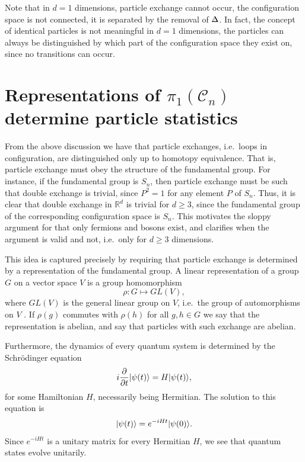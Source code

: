 \documentclass[a4paper,10pt,oneside]{book}
\theoremstyle{plain}
\theoremstyle{definition}
\theoremstyle{remark}
\def\bbDelta{{%
\setbox0\hbox{$\Delta$}%
\rlap{\hbox to \wd0{\hss\scalebox{0.82}{$\Delta$}}}\box0
}}
\DeclarePairedDelimiter\ket{\lvert}{\rangle}
\begin{document}
Note that in $d=1$ dimensions, particle exchange cannot occur, the configuration space is not connected, it is separated by the removal of $\bbDelta$. In fact, the concept of identical particles is not meaningful in $d = 1$ dimensions, the particles can always be distinguished by which part of the configuration space they exist on, since no transitions can occur.











\section{Representations of \texorpdfstring{$\pi_1(\mathcal{C}_n)$}{π₁(Cₙ)} determine particle statistics}

From the above discussion we have that particle exchanges, i.e.\ loops in configuration, are distinguished only up to homotopy equivalence. That is, particle exchange must obey the structure of the fundamental group. For instance, if the fundamental group is $S_n$, then particle exchange must be such that double exchange is trivial, since $P^2 = 1$ for any element $P$ of $S_n$. Thus, it is clear that double exchange in $\mathbb{R}^d$ is trivial for $d \ge 3$, since the fundamental group of the corresponding configuration space is $S_n$. This motivates the sloppy argument for that only fermions and bosons exist, and clarifies when the argument is valid and not, i.e.\ only for $d \ge 3$ dimensions.

This idea is captured precisely by requiring that particle exchange is determined by a representation of the fundamental group.
A linear representation of a group $G$ on a vector space $V$ is a group homomorphism
\begin{equation}
  \rho : G \mapsto GL(V),
\end{equation}
where $GL(V)$ is the general linear group on $V$, i.e.\ the group of automorphisms on $V$ \cite{dummit foote}. If $ρ(g)$ commutes with $ρ(h)$ for all $g, h \in G$ we say that the representation is abelian, and say that particles with such exchange are abelian.

Furthermore, the dynamics of every quantum system is determined by the Schrödinger equation
\begin{equation}
  i\frac{\partial}{\partial t}\ket{\psi(t)} = H\ket{\psi(t)},
\end{equation}
for some Hamiltonian $H$, necessarily being Hermitian. The solution to this equation is
\begin{equation}
  \ket{\psi(t)} = e^{-iHt}\ket{\psi(0)}.
\end{equation}
Since $e^{-iHt}$ is a unitary matrix for every Hermitian $H$, we see that quantum states evolve unitarily.
\end{document}
